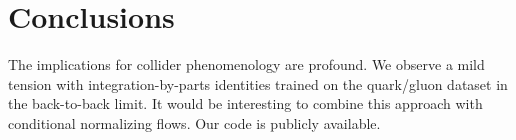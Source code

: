 \section{Conclusions}\label{sec:conclusions}

The implications for collider phenomenology are profound. We observe a
mild tension with integration-by-parts identities trained on the
quark/gluon dataset in the back-to-back limit. It would be interesting
to combine this approach with conditional normalizing flows. Our code is
publicly available.

